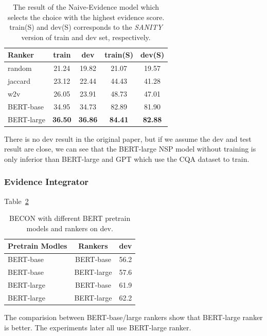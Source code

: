 \documentclass[letterpaper]{article} %
\begin{document}
{\begin{table}[t!]
  \centering
  \begin{tabular}{l c c c c}
  \hline\hline
  {\bf Ranker}  & {\bf train } & {\bf dev} & {\bf train(S)} & {\bf dev(S)} \\
  \hline
  random & 21.24 & 19.82 & 21.07 & 19.57 \\
  jaccard & 23.12 & 22.44 & 44.43 & 41.28 \\
  w2v & 26.05 & 23.91 & 48.73 & 47.01 \\
  BERT-base & 34.95 & 34.73 & 82.89 & 81.90 \\
  BERT-large & {\bf 36.50} & {\bf 36.86} & {\bf 84.41} & {\bf 82.88} \\
  \hline\hline
  \end{tabular}
  \caption{The result of the Naive-Evidence model which selects the choice with the highest evidence score. train(S) and dev(S) corresponds to the {\it SANITY} version of train and dev set, respectively.}
  \label{table:simple_evidence_model}
\end{table}

There is no dev result in the original paper, but if we assume the dev and test result are close, we can see that the BERT-large NSP model without training is only inferior than BERT-large and GPT which use the CQA dataset to train.

\subsubsection{Evidence Integrator}

Table~\ref{table:becon_pretrain_rankers}

\begin{table}[t!]
  \centering
  \begin{tabular}{l c c}
  \hline\hline
  {\bf Pretrain Modles}  & {\bf Rankers } & {\bf dev}  \\
  \hline
  BERT-base & BERT-base & 56.2 \\
  BERT-base & BERT-large & 57.6 \\
  BERT-large & BERT-base & 61.9 \\
  BERT-large & BERT-large & 62.2 \\
  \end{tabular}
  \caption{BECON with different BERT pretrain models and rankers on dev.}
  \label{table:becon_pretrain_rankers}
\end{table}

The comparision between BERT-base/large rankers show that BERT-large ranker is better. The experiments later all use BERT-large ranker.

}
\end{document}
